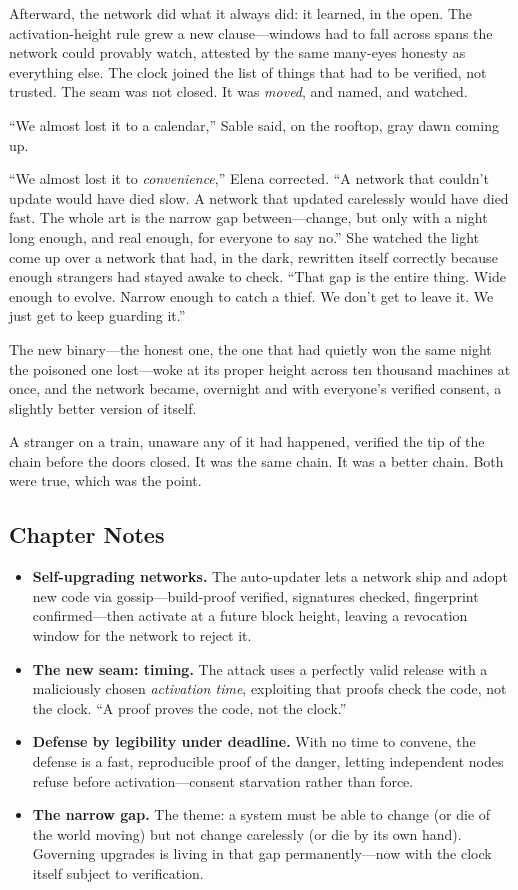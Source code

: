 \documentclass[12pt,letterpaper]{book}
\providecommand{\tightlist}{\setlength{\itemsep}{0pt}\setlength{\parskip}{0pt}}
\begin{document}
Afterward, the network did what it always did: it learned, in the open. The
activation-height rule grew a new clause---windows had to fall across spans the
network could provably watch, attested by the same many-eyes honesty as everything
else. The clock joined the list of things that had to be verified, not trusted. The
seam was not closed. It was \emph{moved}, and named, and watched.

``We almost lost it to a calendar,'' Sable said, on the rooftop, gray dawn coming
up.

``We almost lost it to \emph{convenience},'' Elena corrected. ``A network that
couldn't update would have died slow. A network that updated carelessly would have
died fast. The whole art is the narrow gap between---change, but only with a night
long enough, and real enough, for everyone to say no.'' She watched the light come
up over a network that had, in the dark, rewritten itself correctly because enough
strangers had stayed awake to check. ``That gap is the entire thing. Wide enough to
evolve. Narrow enough to catch a thief. We don't get to leave it. We just get to
keep guarding it.''

The new binary---the honest one, the one that had quietly won the same night the
poisoned one lost---woke at its proper height across ten thousand machines at once,
and the network became, overnight and with everyone's verified consent, a slightly
better version of itself.

A stranger on a train, unaware any of it had happened, verified the tip of the
chain before the doors closed. It was the same chain. It was a better chain. Both
were true, which was the point.

\hypertarget{chapter-18-notes}{%
\subsection{Chapter Notes}\label{chapter-18-notes}}

\begin{itemize}
\tightlist
\item
  \textbf{Self-upgrading networks.} The auto-updater lets a network ship and adopt
  new code via gossip---build-proof verified, signatures checked, fingerprint
  confirmed---then activate at a future block height, leaving a revocation window
  for the network to reject it.
\item
  \textbf{The new seam: timing.} The attack uses a perfectly valid release with a
  maliciously chosen \emph{activation time}, exploiting that proofs check the code,
  not the clock. ``A proof proves the code, not the clock.''
\item
  \textbf{Defense by legibility under deadline.} With no time to convene,
  the defense is a fast, reproducible proof of the danger, letting independent
  nodes refuse before activation---consent starvation rather than force.
\item
  \textbf{The narrow gap.} The theme: a system must be able to change (or die of
  the world moving) but not change carelessly (or die by its own hand). Governing
  upgrades is living in that gap permanently---now with the clock itself subject to
  verification.
\end{itemize}
\end{document}
